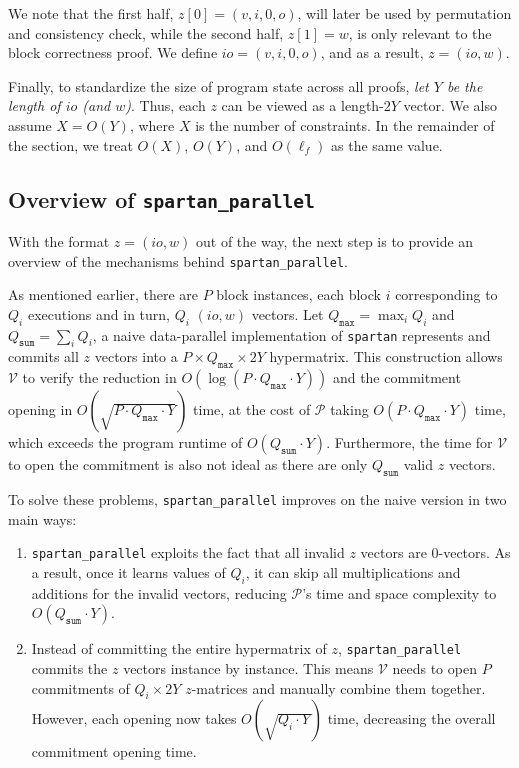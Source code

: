 \documentclass{article}
\newcommand{\code}{\texttt}
\newcommand{\Qsum}{Q_{\mathtt{sum}}}
\newcommand{\Qmax}{Q_{\mathtt{max}}}
\renewcommand{\P}{\mathcal{P}}
\newcommand{\V}{\mathcal{V}}
\begin{document}
We note that the first half, $z[0] = (v, i, 0, o)$, will later be used by permutation and consistency check, while the second half, $z[1] = w$, is only relevant to the block correctness proof. We define $io = (v, i, 0, o)$, and as a result, $z = (io, w)$.

Finally, to standardize the size of program state across all proofs, \emph{let $Y$ be the length of $io$ (and $w$)}. Thus, each $z$ can be viewed as a length-$2Y$ vector. We also assume $X = O(Y)$, where $X$ is the number of constraints. In the remainder of the section, we treat $O(X)$, $O(Y)$, and $O(\ell_f)$ as the same value.

\subsection{Overview of \code{spartan\_parallel}}
With the format $z = (io, w)$ out of the way, the next step is to provide an overview of the mechanisms behind \code{spartan\_parallel}.

As mentioned earlier, there are $P$ block instances, each block $i$ corresponding to $Q_i$ executions and in turn, $Q_i$ $(io, w)$ vectors. Let $\Qmax = \max_i Q_i$ and $\Qsum = \sum_i Q_i$, a naive data-parallel implementation of \code{spartan} represents and commits all $z$ vectors into a $P\times \Qmax\times 2Y$ hypermatrix. This construction allows $\V$ to verify the reduction in $O(\log (P\cdot \Qmax\cdot Y))$ and the commitment opening in $O(\sqrt{P\cdot \Qmax\cdot Y})$ time, at the cost of $\P$ taking $O(P\cdot \Qmax\cdot Y)$ time, which exceeds the program runtime of $O(\Qsum\cdot Y)$. Furthermore, the time for $\V$ to open the commitment is also not ideal as there are only $\Qsum$ valid $z$ vectors.

To solve these problems, \code{spartan\_parallel} improves on the naive version in two main ways:
\begin{enumerate}
    \item \code{spartan\_parallel} exploits the fact that all invalid $z$ vectors are 0-vectors. As a result, once it learns values of $Q_i$, it can skip all multiplications and additions for the invalid vectors, reducing $\P$'s time and space complexity to $O(\Qsum\cdot Y)$.
    \item Instead of committing the entire hypermatrix of $z$, \code{spartan\_parallel} commits the $z$ vectors instance by instance. This means $\V$ needs to open $P$ commitments of $Q_i\times 2Y$ $z$-matrices and manually combine them together. However, each opening now takes $O(\sqrt{Q_i\cdot Y})$ time, decreasing the overall commitment opening time.
\end{enumerate}
\end{document}

